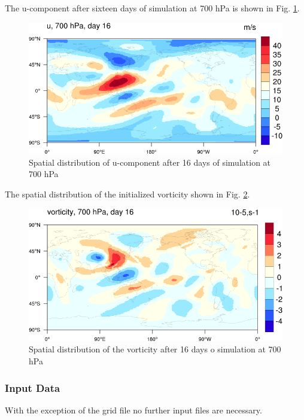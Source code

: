 The u-component after sixteen days of simulation at 700 hPa is shown in Fig. \ref{fig:u-16}.

\begin{figure}[h!]%
\centering
\includegraphics[width=0.95\linewidth]{pictures/u-day-16-small.png}
\caption{Spatial distribution of u-component after 16 days of simulation at 700 hPa}\label{fig:u-16}
\end{figure}


The spatial distribution of the initialized 
vorticity shown in Fig. \ref{fig:vorticity-16}.

\begin{figure}[h!]%
\centering
\includegraphics[width=0.95\linewidth]{pictures/vorticity-d16-small.png}
\caption{Spatial distribution of the vorticity after 16 days o simulation at 700 hPa}\label{fig:vorticity-16}
\end{figure}





\subsubsection{Input Data}

With the exception of the grid file no further input files are necessary. 





